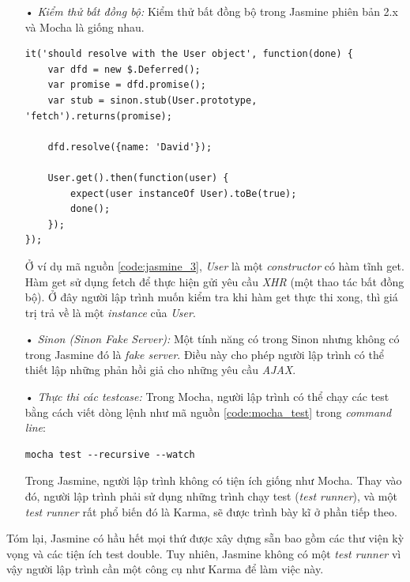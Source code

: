 \documentclass[12pt,a4paper]{article}
\begin{document}
\begin{itemize}
\item[•] \emph{Kiểm thử bất đồng bộ:}
Kiểm thử bất đồng bộ trong Jasmine phiên bản \textsf{2.x} và Mocha là giống nhau.

\begin{lstlisting}[caption=Ví dụ sử dụng Jasmine để kiểm thử bất đồng bộ,label={code:jasmine_3}]
it('should resolve with the User object', function(done) {
	var dfd = new $.Deferred();
	var promise = dfd.promise();
	var stub = sinon.stub(User.prototype, 'fetch').returns(promise);
	
	dfd.resolve({name: 'David'});
	
	User.get().then(function(user) {
		expect(user instanceOf User).toBe(true);
		done();
	});
});
\end{lstlisting}

Ở ví dụ mã nguồn \ref{code:jasmine_3}, \textit{User} là một \textit{constructor} có hàm tĩnh \textsf{get}. Hàm \textsf{get} sử dụng \textsf{fetch} để thực hiện gửi yêu cầu \textit{XHR} (một thao tác bất đồng bộ). Ở đây người lập trình muốn kiểm tra khi hàm \textsf{get} thực thi xong, thì giá trị trả về là một \textit{instance} của \textit{User}.

\item[•] \emph{Sinon (Sinon Fake Server):}
Một tính năng có trong Sinon nhưng không có trong Jasmine đó là \textit{fake server}. Điều này cho phép người lập trình có thể thiết lập những phản hồi giả cho những yêu cầu \textit{AJAX}.

\item[•] \emph{Thực thi các testcase:}
Trong Mocha, người lập trình có thể chạy các test bằng cách viết dòng lệnh như mã nguồn \ref{code:mocha_test} trong \textit{command line}:

\begin{lstlisting}[caption=Khởi chạy trình kiểm thử testcase với Mocha,label={code:mocha_test}]
mocha test --recursive --watch
\end{lstlisting}

Trong Jasmine, người lập trình không có tiện ích giống như Mocha. Thay vào đó, người lập trình phải sử dụng những trình chạy test (\textit{test runner}), và một \textit{test runner} rất phổ biến đó là Karma, sẽ được trình bày kĩ ở phần tiếp theo.
\end{itemize}

Tóm lại, Jasmine có hầu hết mọi thứ được xây dựng sẵn bao gồm các thư viện kỳ vọng và các tiện ích test double. Tuy nhiên, Jasmine không có một \textit{test runner} vì vậy người lập trình cần một công cụ như Karma để làm việc này.
\end{document}
